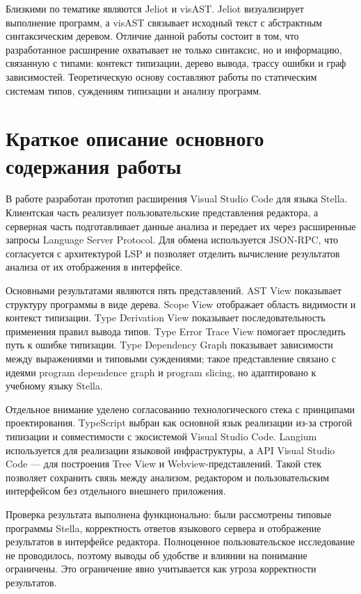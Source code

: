 ﻿\documentclass[14pt,a4paper]{extarticle}
\begin{document}
Близкими по тематике являются Jeliot и visAST. Jeliot визуализирует выполнение программ, а visAST связывает исходный текст с абстрактным синтаксическим деревом. Отличие данной работы состоит в том, что разработанное расширение охватывает не только синтаксис, но и информацию, связанную с типами: контекст типизации, дерево вывода, трассу ошибки и граф зависимостей. Теоретическую основу составляют работы по статическим системам типов, суждениям типизации и анализу программ.

\section*{Краткое описание основного содержания работы}

В работе разработан прототип расширения Visual Studio Code для языка Stella. Клиентская часть реализует пользовательские представления редактора, а серверная часть подготавливает данные анализа и передает их через расширенные запросы Language Server Protocol. Для обмена используется JSON-RPC, что согласуется с архитектурой LSP и позволяет отделить вычисление результатов анализа от их отображения в интерфейсе.

Основными результатами являются пять представлений. AST View показывает структуру программы в виде дерева. Scope View отображает область видимости и контекст типизации. Type Derivation View показывает последовательность применения правил вывода типов. Type Error Trace View помогает проследить путь к ошибке типизации. Type Dependency Graph показывает зависимости между выражениями и типовыми суждениями; такое представление связано с идеями program dependence graph и program slicing, но адаптировано к учебному языку Stella.

Отдельное внимание уделено согласованию технологического стека с принципами проектирования. TypeScript выбран как основной язык реализации из-за строгой типизации и совместимости с экосистемой Visual Studio Code. Langium используется для реализации языковой инфраструктуры, а API Visual Studio Code --- для построения Tree View и Webview-представлений. Такой стек позволяет сохранить связь между анализом, редактором и пользовательским интерфейсом без отдельного внешнего приложения.

Проверка результата выполнена функционально: были рассмотрены типовые программы Stella, корректность ответов языкового сервера и отображение результатов в интерфейсе редактора. Полноценное пользовательское исследование не проводилось, поэтому выводы об удобстве и влиянии на понимание ограничены. Это ограничение явно учитывается как угроза корректности результатов.
\end{document}
